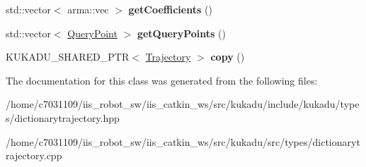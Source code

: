 \begin{DoxyCompactItemize}
\item 
\hypertarget{classkukadu_1_1DictionaryTrajectory_ab118502bdf3cb95cc52f7dc640572deb}{std\-::vector$<$ arma\-::vec $>$ {\bfseries get\-Coefficients} ()}\label{classkukadu_1_1DictionaryTrajectory_ab118502bdf3cb95cc52f7dc640572deb}

\item 
\hypertarget{classkukadu_1_1DictionaryTrajectory_a4d1fd2fcff1e7a696976a2b50bdb1a9a}{std\-::vector$<$ \hyperlink{classkukadu_1_1QueryPoint}{Query\-Point} $>$ {\bfseries get\-Query\-Points} ()}\label{classkukadu_1_1DictionaryTrajectory_a4d1fd2fcff1e7a696976a2b50bdb1a9a}

\item 
\hypertarget{classkukadu_1_1DictionaryTrajectory_a4bdb28bd8c9bb18572f8b1d78c683d02}{K\-U\-K\-A\-D\-U\-\_\-\-S\-H\-A\-R\-E\-D\-\_\-\-P\-T\-R$<$ \hyperlink{classkukadu_1_1Trajectory}{Trajectory} $>$ {\bfseries copy} ()}\label{classkukadu_1_1DictionaryTrajectory_a4bdb28bd8c9bb18572f8b1d78c683d02}

\end{DoxyCompactItemize}


The documentation for this class was generated from the following files\-:\begin{DoxyCompactItemize}
\item 
/home/c7031109/iis\-\_\-robot\-\_\-sw/iis\-\_\-catkin\-\_\-ws/src/kukadu/include/kukadu/types/dictionarytrajectory.\-hpp\item 
/home/c7031109/iis\-\_\-robot\-\_\-sw/iis\-\_\-catkin\-\_\-ws/src/kukadu/src/types/dictionarytrajectory.\-cpp\end{DoxyCompactItemize}
